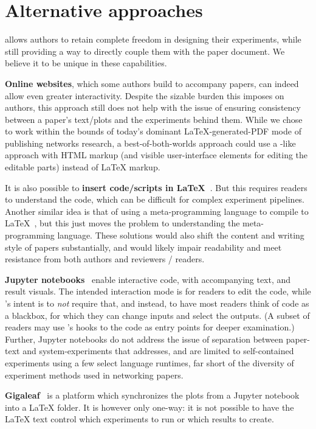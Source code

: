 \section{Alternative approaches}
\label{sec:alternative-approaches}

\sysname allows authors to retain complete freedom in designing their experiments, while still providing a way to directly couple them with the paper document. We believe it to be unique in these capabilities.

\textbf{Online websites}, which some authors build to accompany papers, can indeed allow even greater interactivity. Despite the sizable burden this imposes on authors, this approach still does not help with the issue of ensuring consistency between a paper's text/plots and the experiments behind them. While we chose to work within the bounds of today's dominant \LaTeX{}-generated-PDF mode of publishing networks research, a best-of-both-worlds approach could use a \sysname-like approach with HTML markup (and visible user-interface elements for editing the editable parts) instead of \LaTeX{} markup.

It is also possible to \textbf{insert code/scripts in LaTeX~\cite{pythontex, pynea, bar2020reproduciblelatex}}. But this requires readers to understand the code, which can be difficult for  complex experiment pipelines. Another similar idea is that of using a meta-programming language to compile to \LaTeX{}~\cite{orgmode}, but this just moves the problem to understanding the meta-programming language. These solutions would also shift the content and writing style of papers substantially, and would likely impair readability and meet resistance from both authors and reviewers / readers.

\textbf{Jupyter notebooks}~\cite{jupyter-notebooks} enable interactive code, with accompanying text, and result visuals. The intended interaction mode is for readers to edit the code, while \sysname's intent is to \textit{not} require that, and instead, to have most readers think of code as a blackbox, for which they can change inputs and select the outputs. (A subset of readers may use \sysname's hooks to the code as entry points for deeper examination.) Further, Jupyter notebooks do not address the issue of separation between paper-text and system-experiments that \sysname addresses, and are limited to self-contained experiments using a few select language runtimes, far short of the diversity of experiment methods used in networking papers.

\textbf{Gigaleaf}~\cite{gigaleaf} is a platform which synchronizes the plots from a Jupyter notebook into a \LaTeX{} folder. It is however only one-way: it is not possible to have the \LaTeX{} text control which experiments to run or which results to create.
